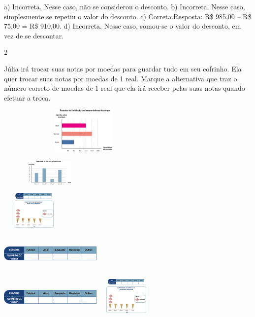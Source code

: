 \begin{multicols}{2}
{\begin{escolha}
a) Incorreta. Nesse caso, não se considerou o desconto.
b) Incorreta. Nesse caso, simplesmente se repetiu o valor do desconto.
c) Correta.Resposta: R\$ 985,00 -- R\$ 75,00 = R\$ 910,00.
d) Incorreta. Nesse caso, somou-se o valor do desconto, em vez de se descontar.

\num{2}

Júlia irá trocar suas notas por moedas para guardar tudo em seu
cofrinho. Ela quer trocar suas notas por moedas de 1 real. Marque a
alternativa que traz o número correto de moedas de 1 real que ela
irá receber pelas suas notas quando efetuar a troca.


\includegraphics[width=3.34196in,height=0.88341in]{media/image82.png}

\begin{escolha}

\item
\includegraphics[width=1.93350in,height=0.50004in]{media/image83.png}

\item
\includegraphics[width=1.26678in,height=0.72506in]{media/image84.png}

\item
\includegraphics[width=1.95850in,height=0.69173in]{media/image85.png}

\item
\includegraphics[width=1.95850in,height=0.69173in]{media/image85.png}\includegraphics[width=1.26678in,height=0.72506in]{media/image84.png}
\end{escolha}


\end{escolha}}
\end{multicols}
